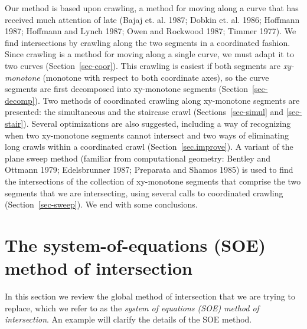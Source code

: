 Our method is based upon crawling, a method for moving along a curve that has 
received much attention of late (Bajaj et. al. 1987; Dobkin et. al. 1986; Hoffmann 1987;
Hoffmann and Lynch 1987; Owen and Rockwood 1987; Timmer 1977).
We find intersections by crawling along the two segments in a coordinated fashion.
Since crawling is a method for moving along a single curve, we must adapt it to two curves
(Section~\ref{sec-coor}).
This crawling is easiest if both segments are {\em xy-monotone} (monotone with 
respect to both coordinate axes), so the curve segments are first decomposed into 
xy-monotone segments (Section~\ref{sec-decomp}).
Two methods of coordinated crawling along xy-monotone segments are presented: 
the simultaneous and the staircase crawl (Sections~\ref{sec-simul} and \ref{sec-stair}).
Several optimizations are also suggested,
including a way of recognizing when two xy-monotone segments cannot intersect 
and two ways of eliminating long crawls within a coordinated crawl (Section~\ref{sec.improve}).
A variant of the plane sweep method (familiar from computational geometry:
Bentley and Ottmann 1979; Edelsbrunner 1987; Preparata and Shamos 1985) is used to find
the intersections of the collection of xy-monotone segments that comprise the two segments
that we are intersecting, using several calls to coordinated crawling (Section~\ref{sec-sweep}).
We end with some conclusions.

\section{The system-of-equations (SOE) method of intersection}
\label{sec-soe}

In this section we review the global method of intersection that we are trying to replace, 
which we refer to as the {\em system of equations (SOE) method of intersection}.
An example will clarify the details of the SOE method.


